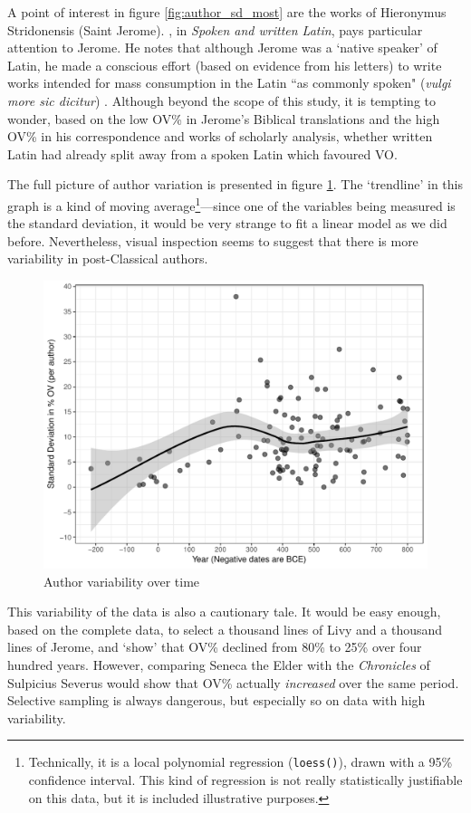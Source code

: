 \documentclass[11pt,a4paper]{scrartcl} %
\begin{document}
\noindent A point of interest in figure \ref{fig:author_sd_most} are the works of Hieronymus Stridonensis (Saint Jerome). \cite{herman}, in \textit{Spoken and written Latin}, pays particular attention to Jerome. He notes that although Jerome was a `native speaker' of Latin, he made a conscious effort (based on evidence from his letters) to write works intended for mass consumption in the Latin ``as commonly spoken" (\textit{vulgi more sic dicitur}) \cite[31--3]{herman}. Although beyond the scope of this study, it is tempting to wonder, based on the low OV\% in Jerome's Biblical translations and the high OV\% in his correspondence and works of scholarly analysis, whether written Latin had already split away from a spoken Latin which favoured VO.

The full picture of author variation is presented in figure \ref{fig:sp_authorvar}. The `trendline' in this graph is a kind of moving average\footnote{Technically, it is a local polynomial regression (\texttt{loess()}), drawn with a 95\% confidence interval. This kind of regression is not really statistically justifiable on this data, but it is included illustrative purposes.}---since one of the variables being measured is the standard deviation, it would be very strange to fit a linear model as we did before. Nevertheless, visual inspection seems to suggest that there is more variability in post-Classical authors. 
\begin{figure}[H]
    \caption{Author variability over time}
    \label{fig:sp_authorvar}
    \includegraphics[width=\textwidth]{sp_authorvar.pdf}
\end{figure}
\noindent This variability of the data is also a cautionary tale. It would be easy enough, based on the complete data, to select a thousand lines of Livy and a thousand lines of Jerome, and `show' that OV\% declined from 80\% to 25\% over four hundred years. However, comparing Seneca the Elder with the \textit{Chronicles} of Sulpicius Severus would show that OV\% actually \textit{increased} over the same period. Selective sampling is always dangerous, but especially so on data with high variability.
\end{document}
